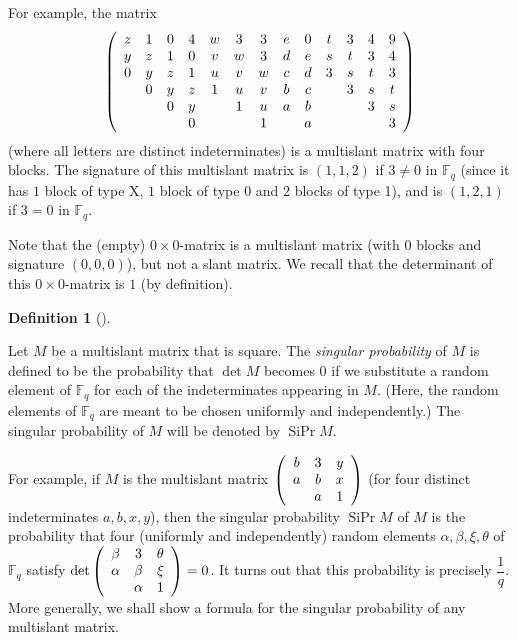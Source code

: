 \documentclass[numbers=enddot,12pt,final,onecolumn,notitlepage]{scrartcl}%
\theoremstyle{definition}
\newtheorem{defi}[theo]{Definition}
\newenvironment{definition}[1][]
{\begin{defi}[#1]\begin{leftbar}}
{\end{leftbar}\end{defi}}
\newcommand{\Fq}{\mathbb{F}_q}
\theoremstyle{plainsl}
\begin{document}
For example, the matrix%
\[
\left(
\begin{array}
[c]{ccccccccccccc}%
z & 1 & 0 & 4 & w & 3 & 3 & e & 0 & t & 3 & 4 & 9\\
y & z & 1 & 0 & v & w & 3 & d & e & s & t & 3 & 4\\
0 & y & z & 1 & u & v & w & c & d & 3 & s & t & 3\\
& 0 & y & z & 1 & u & v & b & c &  & 3 & s & t\\
&  & 0 & y &  & 1 & u & a & b &  &  & 3 & s\\
&  &  & 0 &  &  & 1 &  & a &  &  &  & 3
\end{array}
\right)
\]
(where all letters are distinct indeterminates) is a multislant matrix with
four blocks. The signature of this multislant matrix is $\left(  1,1,2\right)
$ if $3\neq0$ in $\Fq$ (since it has $1$ block of type X, $1$ block of type 0
and $2$ blocks of type 1), and is $\left(  1,2,1\right)  $ if $3=0$ in $\Fq$.

Note that the (empty) $0\times0$-matrix is a multislant matrix (with $0$
blocks and signature $\left(  0,0,0\right)  $), but not a slant matrix. We
recall that the determinant of this $0\times0$-matrix is $1$ (by definition).

\begin{definition}
\label{def.SiPr}Let $M$ be a multislant matrix that is square. The
\emph{singular probability} of $M$ is defined to be the probability that $\det
M$ becomes $0$ if we substitute a random element of $\Fq$ for each of the
indeterminates appearing in $M$. (Here, the random elements of $\Fq$ are meant
to be chosen uniformly and independently.) The singular probability of $M$
will be denoted by $\operatorname*{SiPr}M$.
\end{definition}

For example, if $M$ is the multislant matrix $\left(
\begin{array}
[c]{ccc}%
b & 3 & y\\
a & b & x\\
& a & 1
\end{array}
\right)  $ (for four distinct indeterminates $a,b,x,y$), then the singular
probability $\operatorname*{SiPr}M$ of $M$ is the probability that four
(uniformly and independently) random elements $\alpha,\beta,\xi,\theta$ of $\Fq$
satisfy $\det\left(
\begin{array}
[c]{ccc}%
\beta & 3 & \theta\\
\alpha & \beta & \xi\\
& \alpha & 1
\end{array}
\right)  =0$. It turns out that this probability is precisely $\dfrac{1}{q}$.
More generally, we shall show a formula for the singular probability of any
multislant matrix.
\end{document}
